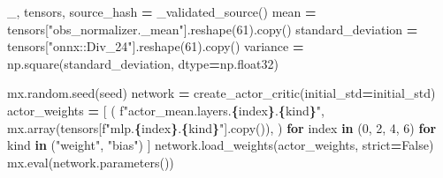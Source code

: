 \documentclass[
  american,
  11pt,
  letterpaper,
]{article}
\newenvironment{Shaded}{\begin{snugshade}}{\end{snugshade}}
\newcommand{\BuiltInTok}[1]{#1}
\newcommand{\ControlFlowTok}[1]{\textcolor[rgb]{0.13,0.29,0.53}{\textbf{#1}}}
\newcommand{\DecValTok}[1]{\textcolor[rgb]{0.00,0.00,0.81}{#1}}
\newcommand{\KeywordTok}[1]{\textcolor[rgb]{0.13,0.29,0.53}{\textbf{#1}}}
\newcommand{\NormalTok}[1]{#1}
\newcommand{\OperatorTok}[1]{\textcolor[rgb]{0.81,0.36,0.00}{\textbf{#1}}}
\newcommand{\SpecialCharTok}[1]{\textcolor[rgb]{0.81,0.36,0.00}{\textbf{#1}}}
\newcommand{\SpecialStringTok}[1]{\textcolor[rgb]{0.31,0.60,0.02}{#1}}
\newcommand{\StringTok}[1]{\textcolor[rgb]{0.31,0.60,0.02}{#1}}
\newcommand{\VariableTok}[1]{\textcolor[rgb]{0.00,0.00,0.00}{#1}}
\renewenvironment{Shaded}{\par\smallskip}{\par\smallskip}
\begin{document}
\begin{Shaded}
\begin{Highlighting}[]
\NormalTok{    \_, tensors, source\_hash }\OperatorTok{=}\NormalTok{ \_validated\_source()}
\NormalTok{    mean }\OperatorTok{=}\NormalTok{ tensors[}\StringTok{"obs\_normalizer.\_mean"}\NormalTok{].reshape(}\DecValTok{61}\NormalTok{).copy()}
\NormalTok{    standard\_deviation }\OperatorTok{=}\NormalTok{ tensors[}\StringTok{"onnx::Div\_24"}\NormalTok{].reshape(}\DecValTok{61}\NormalTok{).copy()}
\NormalTok{    variance }\OperatorTok{=}\NormalTok{ np.square(standard\_deviation, dtype}\OperatorTok{=}\NormalTok{np.float32)}

\NormalTok{    mx.random.seed(seed)}
\NormalTok{    network }\OperatorTok{=}\NormalTok{ create\_actor\_critic(initial\_std}\OperatorTok{=}\NormalTok{initial\_std)}
\NormalTok{    actor\_weights }\OperatorTok{=}\NormalTok{ [}
\NormalTok{        (}
            \SpecialStringTok{f"actor\_mean.layers.}\SpecialCharTok{\{}\NormalTok{index}\SpecialCharTok{\}}\SpecialStringTok{.}\SpecialCharTok{\{}\NormalTok{kind}\SpecialCharTok{\}}\SpecialStringTok{"}\NormalTok{,}
\NormalTok{            mx.array(tensors[}\SpecialStringTok{f"mlp.}\SpecialCharTok{\{}\NormalTok{index}\SpecialCharTok{\}}\SpecialStringTok{.}\SpecialCharTok{\{}\NormalTok{kind}\SpecialCharTok{\}}\SpecialStringTok{"}\NormalTok{].copy()),}
\NormalTok{        )}
        \ControlFlowTok{for}\NormalTok{ index }\KeywordTok{in}\NormalTok{ (}\DecValTok{0}\NormalTok{, }\DecValTok{2}\NormalTok{, }\DecValTok{4}\NormalTok{, }\DecValTok{6}\NormalTok{)}
        \ControlFlowTok{for}\NormalTok{ kind }\KeywordTok{in}\NormalTok{ (}\StringTok{"weight"}\NormalTok{, }\StringTok{"bias"}\NormalTok{)}
\NormalTok{    ]}
\NormalTok{    network.load\_weights(actor\_weights, strict}\OperatorTok{=}\VariableTok{False}\NormalTok{)}
\NormalTok{    mx.}\BuiltInTok{eval}\NormalTok{(network.parameters())}


\end{Highlighting}
\end{Shaded}
\end{document}
